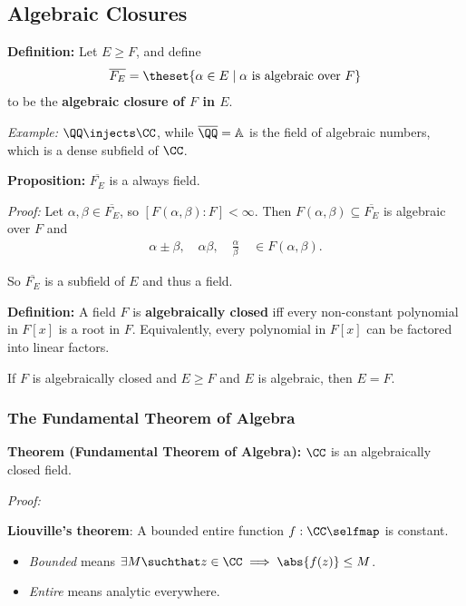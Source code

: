\hypertarget{algebraic-closures}{%
\subsection{Algebraic Closures}\label{algebraic-closures}}

\textbf{Definition:} Let \(E \geq F\), and define
\begin{align*}
\overline{F_E} = \theset{\alpha \in E \mid \alpha \text{ is algebraic over } F}
\end{align*} to be the \textbf{algebraic closure of \(F\) in \(E\)}.

\emph{Example:} \(\QQ \injects \CC\), while \(\overline \QQ = \Bbb{A}\)
is the field of algebraic numbers, which is a dense subfield of \(\CC\).

\textbf{Proposition:} \(\overline{F_E}\) is a always field.

\emph{Proof:} Let \(\alpha, \beta \in \overline{F_E}\), so
\([F(\alpha, \beta): F] < \infty\). Then
\(F(\alpha, \beta) \subseteq \overline{F_E}\) is algebraic over \(F\)
and
\begin{align*}
\alpha\pm \beta, \quad \alpha\beta,\quad \frac \alpha \beta \quad  \in F(\alpha, \beta)
.\end{align*}

So \(\overline{F_E}\) is a subfield of \(E\) and thus a field.

\textbf{Definition:} A field \(F\) is \textbf{algebraically closed} iff
every non-constant polynomial in \(F[x]\) is a root in \(F\).
Equivalently, every polynomial in \(F[x]\) can be factored into linear
factors.

If \(F\) is algebraically closed and \(E\geq F\) and \(E\) is algebraic,
then \(E=F\).

\hypertarget{the-fundamental-theorem-of-algebra}{%
\subsubsection{The Fundamental Theorem of
Algebra}\label{the-fundamental-theorem-of-algebra}}

\textbf{Theorem (Fundamental Theorem of Algebra):} \(\CC\) is an
algebraically closed field.

\emph{Proof:}

\textbf{Liouville's theorem}: A bounded entire function
\(f: \CC \selfmap\) is constant.

\begin{itemize}
\item
  \emph{Bounded} means
  \(\exists M \suchthat z\in \CC \implies \abs{f(z)} \leq M\).
\item
  \emph{Entire} means analytic everywhere.
\end{itemize}

